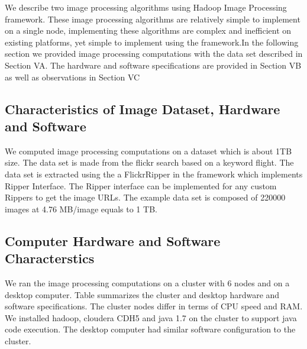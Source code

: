 \documentclass[conference]{IEEEtran}
\begin{document}
We describe two image processing algorithms using Hadoop Image Processing framework. These image processing algorithms are relatively simple to implement on a single node, implementing these algorithms are complex and inefficient on existing platforms, yet simple to implement using the framework.In the following section we provided image processing computations with the data set described in Section VA. The hardware and software specifications are provided in Section VB as well as observations in Section VC 




\subsection{Characteristics of Image Dataset, Hardware and Software}
We computed image processing computations on a dataset which is about 1TB size. The data set is made from the flickr search based on a keyword flight. The data set is extracted using the a FlickrRipper in the framework which implements Ripper Interface. The Ripper interface can be implemented for any custom Rippers to get the image URLs. The example data set is composed of 220000 images at 4.76 MB/image equals to 1 TB.  

\subsection{Computer Hardware and Software Characterstics}
We ran the image processing computations on a cluster with 6 nodes and on a desktop computer. Table summarizes the cluster and desktop hardware and software specifications. The cluster nodes differ in terms of CPU speed and RAM. We installed hadoop, cloudera CDH5 and java 1.7 on the cluster to support java code execution. The desktop computer had similar software configuration to the cluster.
\end{document}

